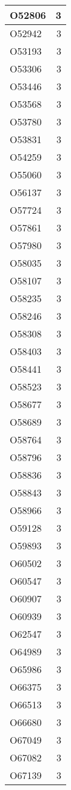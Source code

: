 \documentclass[
]{book}
\theoremstyle{definition}
\theoremstyle{definition}
\theoremstyle{definition}
\theoremstyle{definition}
\theoremstyle{remark}
\begin{document}
\begin{table}
\begin{tabular}{l|r}
\hline
O52806 & 3\\
\hline
O52942 & 3\\
\hline
O53193 & 3\\
\hline
O53306 & 3\\
\hline
O53446 & 3\\
\hline
O53568 & 3\\
\hline
O53780 & 3\\
\hline
O53831 & 3\\
\hline
O54259 & 3\\
\hline
O55060 & 3\\
\hline
O56137 & 3\\
\hline
O57724 & 3\\
\hline
O57861 & 3\\
\hline
O57980 & 3\\
\hline
O58035 & 3\\
\hline
O58107 & 3\\
\hline
O58235 & 3\\
\hline
O58246 & 3\\
\hline
O58308 & 3\\
\hline
O58403 & 3\\
\hline
O58441 & 3\\
\hline
O58523 & 3\\
\hline
O58677 & 3\\
\hline
O58689 & 3\\
\hline
O58764 & 3\\
\hline
O58796 & 3\\
\hline
O58836 & 3\\
\hline
O58843 & 3\\
\hline
O58966 & 3\\
\hline
O59128 & 3\\
\hline
O59893 & 3\\
\hline
O60502 & 3\\
\hline
O60547 & 3\\
\hline
O60907 & 3\\
\hline
O60939 & 3\\
\hline
O62547 & 3\\
\hline
O64989 & 3\\
\hline
O65986 & 3\\
\hline
O66375 & 3\\
\hline
O66513 & 3\\
\hline
O66680 & 3\\
\hline
O67049 & 3\\
\hline
O67082 & 3\\
\hline
O67139 & 3\\

\end{tabular}
\end{table}
\end{document}
